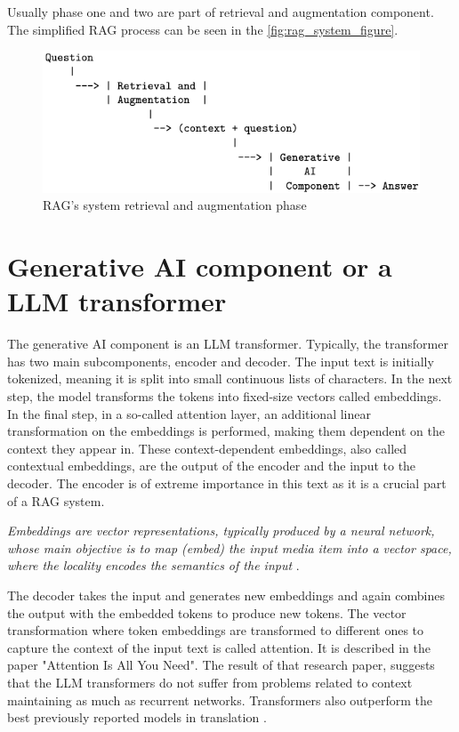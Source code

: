 \documentclass{wseas}
\begin{document}
Usually phase one and two are part of retrieval and augmentation component. The 
simplified RAG process can be seen in the \autoref{fig:rag_system_figure}.

\begin{figure}[htbp]
  \centering
  \includegraphics[width=\linewidth]{resources/v1/retrievalAndAugmentation.png}
  \caption{RAG's system retrieval and augmentation phase}
  \label{fig:rag_system_figure}
\end{figure}

\section{Generative AI component or a LLM transformer}

The generative AI component is an LLM transformer. Typically, the
transformer has two main subcomponents, encoder and decoder. The
input text is initially tokenized, meaning it is split into small
continuous lists of characters. In the next step, the model transforms
the tokens into fixed-size vectors called embeddings. In the final step,
in a so-called attention layer, an additional linear transformation on
the embeddings is performed, making them dependent on the context they
appear in. These context-dependent embeddings, also called contextual
embeddings, are the output of the encoder and the input to the decoder.
The encoder is of extreme importance in this text as it is a crucial
part of a RAG system.

\emph{Embeddings are vector representations, typically produced by a
neural network, whose main objective is to map (embed) the input media
item into a vector space, where the locality encodes the semantics of
the input} \cite{the_faiss_library}.


The decoder takes the input and generates new embeddings and again
combines the output with the embedded tokens to produce new tokens. The
vector transformation where token embeddings are transformed to
different ones to capture the context of the input text is called
attention. It is described in the paper "Attention Is All You Need". 
The result of that research paper, suggests that 
the LLM transformers do not suffer from problems related to context 
maintaining as much as recurrent networks. Transformers also outperform the 
best previously reported models in translation \cite{attention_is_all_you_need}.
\end{document}
